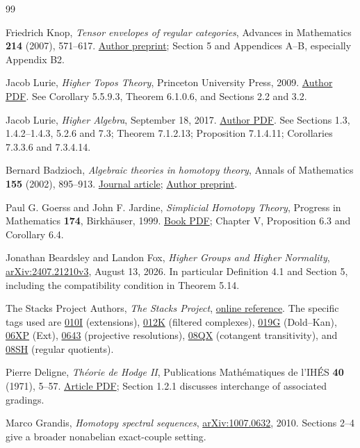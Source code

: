 \begin{thebibliography}{99}
Friedrich Knop, \emph{Tensor envelopes of regular categories},
Advances in Mathematics \textbf{214} (2007), 571--617.
\href{https://arxiv.org/pdf/math/0610552}{Author preprint};
Section 5 and Appendices A--B, especially Appendix B2.

Jacob Lurie, \emph{Higher Topos Theory}, Princeton University Press, 2009.
\href{https://www.math.ias.edu/~lurie/papers/HTT.pdf}{Author PDF}.
See Corollary 5.5.9.3, Theorem 6.1.0.6, and Sections 2.2 and 3.2.

Jacob Lurie, \emph{Higher Algebra}, September 18, 2017.
\href{https://www.math.ias.edu/~lurie/papers/HA.pdf}{Author PDF}.
See Sections 1.3, 1.4.2--1.4.3, 5.2.6 and 7.3;
Theorem 7.1.2.13; Proposition 7.1.4.11;
Corollaries 7.3.3.6 and 7.3.4.14.

Bernard Badzioch, \emph{Algebraic theories in homotopy theory},
Annals of Mathematics \textbf{155} (2002), 895--913.
\href{https://annals.math.princeton.edu/2002/155-3/p06}{Journal article};
\href{https://arxiv.org/abs/math/0110101}{Author preprint}.

Paul G. Goerss and John F. Jardine, \emph{Simplicial Homotopy Theory},
Progress in Mathematics \textbf{174}, Birkh\"auser, 1999.
\href{https://www.sas.rochester.edu/mth/sites/doug-ravenel/otherpapers/Goerss-Jardine2.pdf}{Book PDF};
Chapter V, Proposition 6.3 and Corollary 6.4.

Jonathan Beardsley and Landon Fox, \emph{Higher Groups and Higher Normality},
\href{https://arxiv.org/html/2407.21210v3}{arXiv:2407.21210v3},
August 13, 2026. In particular Definition 4.1 and Section 5,
including the compatibility condition in Theorem 5.14.

The Stacks Project Authors, \emph{The Stacks Project},
\href{https://stacks.math.columbia.edu/}{online reference}.
The specific tags used are
\href{https://stacks.math.columbia.edu/tag/010I}{010I} (extensions),
\href{https://stacks.math.columbia.edu/tag/012K}{012K} (filtered complexes),
\href{https://stacks.math.columbia.edu/tag/019G}{019G} (Dold--Kan),
\href{https://stacks.math.columbia.edu/tag/06XP}{06XP} (Ext),
\href{https://stacks.math.columbia.edu/tag/0643}{0643} (projective resolutions),
\href{https://stacks.math.columbia.edu/tag/08QX}{08QX} (cotangent transitivity),
and \href{https://stacks.math.columbia.edu/tag/08SH}{08SH} (regular quotients).

Pierre Deligne, \emph{Th\'eorie de Hodge II},
Publications Math\'ematiques de l'IH\'ES \textbf{40} (1971), 5--57.
\href{https://www.numdam.org/item/10.1007/BF02684692.pdf}{Article PDF};
Section 1.2.1 discusses interchange of associated gradings.

Marco Grandis, \emph{Homotopy spectral sequences},
\href{https://arxiv.org/pdf/1007.0632}{arXiv:1007.0632}, 2010.
Sections 2--4 give a broader nonabelian exact-couple setting.
\end{thebibliography}
